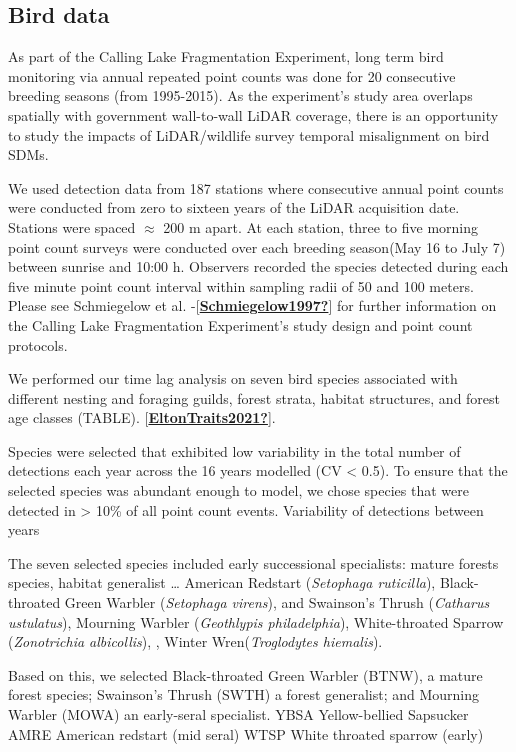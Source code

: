 \documentclass[manuscript, 3p, authoryear]{elsarticle} %
\begin{document}
\hypertarget{bird-data}{%
\subsection{Bird data}\label{bird-data}}

As part of the Calling Lake Fragmentation Experiment, long term bird monitoring via annual repeated point counts was done for 20 consecutive breeding seasons (from 1995-2015). As the experiment's study area overlaps spatially with government wall-to-wall LiDAR coverage, there is an opportunity to study the impacts of LiDAR/wildlife survey temporal misalignment on bird SDMs.

We used detection data from 187 stations where consecutive annual point counts were conducted from zero to sixteen years of the LiDAR acquisition date. Stations were spaced \(\approx\) 200 m apart. At each station, three to five morning point count surveys were conducted over each breeding season(May 16 to July 7) between sunrise and 10:00 h. Observers recorded the species detected during each five minute point count interval within sampling radii of 50 and 100 meters. Please see Schmiegelow et al. -{[}\protect\hyperlink{ref-Schmiegelow1997}{\textbf{Schmiegelow1997?}}{]} for further information on the Calling Lake Fragmentation Experiment's study design and point count protocols.

We performed our time lag analysis on seven bird species associated with different nesting and foraging guilds, forest strata, habitat structures, and forest age classes (TABLE). {[}\protect\hyperlink{ref-EltonTraits2021}{\textbf{EltonTraits2021?}}{]}.

Species were selected that exhibited low variability in the total number of detections each year across the 16 years modelled (CV \textless{} 0.5). To ensure that the selected species was abundant enough to model, we chose species that were detected in \textgreater{} 10\% of all point count events. Variability of detections between years

The seven selected species included early successional specialists: mature forests species, habitat generalist \ldots{} American Redstart (\emph{Setophaga ruticilla}), Black-throated Green Warbler (\emph{Setophaga virens}), and Swainson's Thrush (\emph{Catharus ustulatus}), Mourning Warbler (\emph{Geothlypis philadelphia}), White-throated Sparrow (\emph{Zonotrichia albicollis}), , Winter Wren(\emph{Troglodytes hiemalis}).

Based on this, we selected Black-throated Green Warbler (BTNW), a mature forest species; Swainson's Thrush (SWTH) a forest generalist; and Mourning Warbler (MOWA) an early-seral specialist. YBSA Yellow-bellied Sapsucker AMRE American redstart (mid seral) WTSP White throated sparrow (early)
\end{document}

